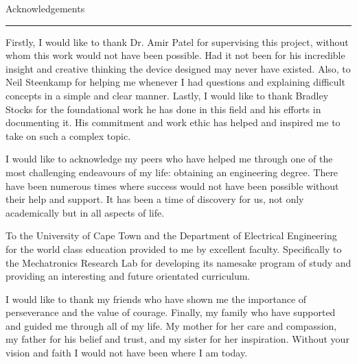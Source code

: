 \pagestyle{plain}


{\Large Acknowledgements}
\vskip 5mm
\hrule
\vskip 5mm

Firstly, I would like to thank Dr. Amir Patel for supervising this project, without whom this work would not have been possible. Had it not been for his incredible insight and creative thinking the device designed may never have existed. Also, to Neil Steenkamp for helping me whenever I had questions and explaining difficult concepts in a simple and clear manner. Lastly, I would like to thank Bradley Stocks for the foundational work he has done in this field and his efforts in documenting it. His commitment and work ethic has helped and inspired me to take on such a complex topic.

I would like to acknowledge my peers who have helped me through one of the most challenging endeavours of my life: obtaining an engineering degree. There have been numerous times where success would not have been possible without their help and support. It has been a time of discovery for us, not only academically but in all aspects of life.

To the University of Cape Town and the Department of Electrical Engineering for the world class education provided to me by excellent faculty. Specifically to the Mechatronics Research Lab for developing its namesake program of study and providing an interesting and future orientated curriculum. 

I would like to thank my friends who have shown me the importance of perseverance and the value of courage. Finally, my family who have supported and guided me through all of my life. My mother for her care and compassion, my father for his belief and trust, and my sister for her inspiration. Without your vision and faith I would not have been where I am today. 

 





